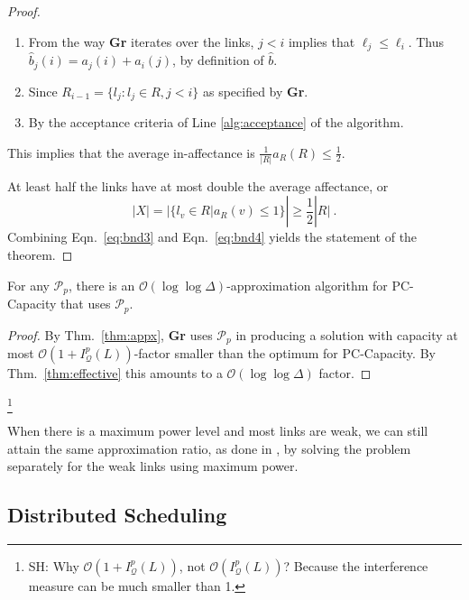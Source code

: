 \documentclass[11pt]{amsart}
\newcommand{\cal}[1]{\mathcal{#1}}
\newcommand{\BO}{\mathcal{O}}
\def\calP{{\cal P}}
\def\calQ{{\cal Q}}
\def\SetR{R}
\newcommand{\prob}[1]{\textsf{#1}}  \newcommand{\alg}[1]{\textbf{#1}}
\def\calP{{\cal P}}   \def\calM{{\cal M}}   \def\calU{{\cal U}}   \newcommand{\PCopt}{\overline{OPT}}
\newcommand{\powp}{\calP_p}
\begin{document}
\begin{proof}
\begin{enumerate}
\item From the way \alg{Gr} iterates over the links, $j < i$ implies that $\ell_j \leq \ell_i$. Thus  $\hat b_j(i) =  a_j(i)+a_i(j)$, by definition of $\hat b$.
\item Since $\SetR_{i-1} = \{l_j : l_j \in \SetR, j < i\}$ as specified by \alg{Gr}.
\item By the acceptance criteria of Line \ref{alg:acceptance} of the algorithm.
\end{enumerate}
This implies that the average in-affectance is $\frac1{|\SetR|} a_\SetR(\SetR) \leq \frac12$. 

At least half the links have at most double the average
affectance, or
\begin{equation}
|X| = |\{l_v \in \SetR | a_{\SetR}(v) \le 1 \}| \ge \frac{1}{2}|\SetR| \ .
\label{eq:bnd4}
\end{equation}
Combining Eqn.\ \ref{eq:bnd3} and Eqn.\ \ref{eq:bnd4} yields the statement of the theorem.
\end{proof}



\begin{theorem}
For any $\powp$, there is an 
$\BO(\log\log \Delta)$-approximation algorithm for 
\prob{PC-Capacity} that uses $\powp$.
\label{thm:appxpc}
\end{theorem}
\begin{proof}
By Thm.~\ref{thm:appx}, {\alg{Gr}} uses $\powp$ in producing a solution with capacity at most $\BO(1+I^p_{\calQ}(L))$-factor smaller than the optimum for \prob{PC-Capacity}. By Thm.~\ref{thm:effective} this amounts to a $\BO(\log\log \Delta)$ factor.
\end{proof}
\footnote{SH: Why $\BO(1+I^p_{\calQ}(L))$, not $\BO(I^p_{\calQ}(L))$?
Because the interference measure can be much smaller than 1.}

When there is a maximum power level and most links are weak,
we can still attain the same approximation ratio, as done in \cite{SODA11}, by solving the problem separately for the weak links using maximum power.
\iffalse
The following corollary follows similarly from Theorem \ref{thm:indind} and Theorem \ref{thm:appx}:

\begin{corollary}
There is an $\BO(1)$-approximate algorithm for
the capacity problem for any $\powp$ on non-weak links.
\label{cor:appx}
\end{corollary}
\fi



\subsection{Distributed Scheduling}
\end{document}
